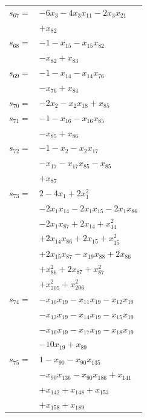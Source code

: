 \begin{longtable}{@{}r@{\;}l@{}}
\(s_{67}=\) & \(\displaystyle -6x_{3} -4x_{3}x_{11} -2x_{3}x_{21}\) \\
 & \(\displaystyle +x_{82}\) \\[3pt]
\(s_{68}=\) & \(\displaystyle -1 -x_{15} -x_{15}x_{82}\) \\
 & \(\displaystyle -x_{82} +x_{83}\) \\[3pt]
\(s_{69}=\) & \(\displaystyle -1 -x_{14} -x_{14}x_{76}\) \\
 & \(\displaystyle -x_{76} +x_{84}\) \\[3pt]
\(s_{70}=\) & \(\displaystyle -2x_{2} -x_{2}x_{18} +x_{85}\) \\[3pt]
\(s_{71}=\) & \(\displaystyle -1 -x_{16} -x_{16}x_{85}\) \\
 & \(\displaystyle -x_{85} +x_{86}\) \\[3pt]
\(s_{72}=\) & \(\displaystyle -1 -x_{2} -x_{2}x_{17}\) \\
 & \(\displaystyle -x_{17} -x_{17}x_{85} -x_{85}\) \\
 & \(\displaystyle +x_{87}\) \\[3pt]
\(s_{73}=\) & \(\displaystyle 2 -4x_{1} +2x_{1}^{2}\) \\
 & \(\displaystyle -2x_{1}x_{14} -2x_{1}x_{15} -2x_{1}x_{86}\) \\
 & \(\displaystyle -2x_{1}x_{87} +2x_{14} +x_{14}^{2}\) \\
 & \(\displaystyle +2x_{14}x_{86} +2x_{15} +x_{15}^{2}\) \\
 & \(\displaystyle +2x_{15}x_{87} -x_{19}x_{88} +2x_{86}\) \\
 & \(\displaystyle +x_{86}^{2} +2x_{87} +x_{87}^{2}\) \\
 & \(\displaystyle +x_{205}^{2} +x_{206}^{2}\) \\[3pt]
\(s_{74}=\) & \(\displaystyle -x_{10}x_{19} -x_{11}x_{19} -x_{12}x_{19}\) \\
 & \(\displaystyle -x_{13}x_{19} -x_{14}x_{19} -x_{15}x_{19}\) \\
 & \(\displaystyle -x_{16}x_{19} -x_{17}x_{19} -x_{18}x_{19}\) \\
 & \(\displaystyle -10x_{19} +x_{89}\) \\[3pt]
\(s_{75}=\) & \(\displaystyle 1 -x_{90} -x_{90}x_{135}\) \\
 & \(\displaystyle -x_{90}x_{136} -x_{90}x_{186} +x_{141}\) \\
 & \(\displaystyle +x_{142} +x_{148} +x_{153}\) \\
 & \(\displaystyle +x_{158} +x_{189}\) \\[3pt]

\end{longtable}
